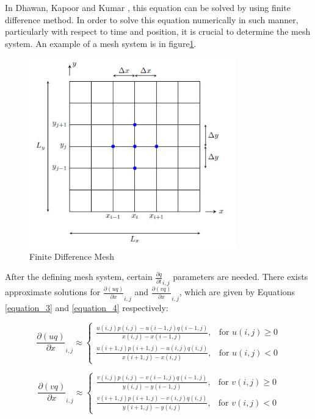 \documentclass{article}
\begin{document}
In Dhawan, Kapoor and Kumar \cite{dhawan2012numerical}, this equation can be solved by using finite difference method. In order to solve this equation numerically in such manner, particularly with respect to time and position, it is crucial to determine the mesh system. An example of a mesh system is in figure\ref{figure_1}.\\

\begin{figure}[hbt!]
    \centering
    \includegraphics[width=0.8\textwidth]{Figures/finite_difference_picture.jpg}
    \caption{Finite Difference Mesh}
    \label{figure_1}
\end{figure}

After the defining mesh system, certain  $\frac{\partial q}{\partial t}_{i,j}$ parameters are needed. There exists approximate solutions for $\frac{\partial (uq)}{\partial x}_{i,j}$ and $\frac{\partial (vq)}{\partial x}_{i,j}$, which are given by Equations \ref{equation_3} and \ref{equation_4} respectively:

\begin{equation}
\frac{\partial (uq)}{\partial x}_{i,j} \approx
\begin{cases}
    \frac{u(i, j)p(i, j) - u(i-1, j)q(i-1, j)}{x(i, j) - x(i-1, j)}, & \text{for } u(i, j) \geq 0 \\
    \frac{u(i+1, j)p(i+1, j) - u(i, j)q(i, j)}{x(i+1, j) - x(i, j)}, & \text{for } u(i, j) < 0
\end{cases}
\label{equation_3}
\end{equation}

\begin{equation}
\frac{\partial (vq)}{\partial x}_{i,j} \approx
\begin{cases}
    \frac{v(i, j)p(i, j) - v(i-1, j)q(i-1, j)}{y(i, j) - y(i-1, j)}, & \text{for } v(i, j) \geq 0 \\
    \frac{v(i+1, j)p(i+1, j) - v(i, j)q(i, j)}{y(i+1, j) - y(i, j)}, & \text{for } v(i, j) < 0
\end{cases}
\label{equation_4}
\end{equation}
\end{document}
